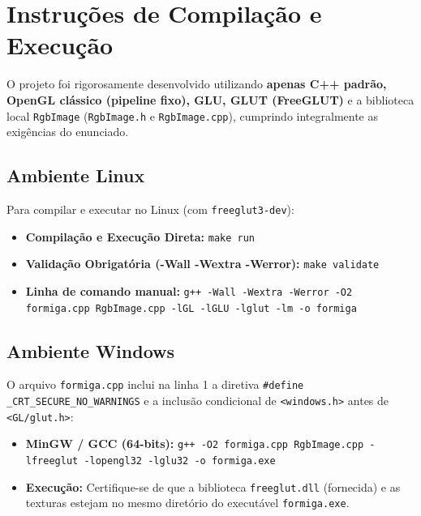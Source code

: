 \documentclass[11pt,a4paper]{article}
\begin{document}
\section{Instruções de Compilação e Execução}

O projeto foi rigorosamente desenvolvido utilizando \textbf{apenas C++ padrão, OpenGL clássico (pipeline fixo), GLU, GLUT (FreeGLUT)} e a biblioteca local \texttt{RgbImage} (\texttt{RgbImage.h} e \texttt{RgbImage.cpp}), cumprindo integralmente as exigências do enunciado.

\subsection{Ambiente Linux}
Para compilar e executar no Linux (com \texttt{freeglut3-dev}):
\begin{itemize}[leftmargin=*,noitemsep]
    \item \textbf{Compilação e Execução Direta:} \texttt{make run}
    \item \textbf{Validação Obrigatória (-Wall -Wextra -Werror):} \texttt{make validate}
    \item \textbf{Linha de comando manual:}
    \texttt{g++ -Wall -Wextra -Werror -O2 formiga.cpp RgbImage.cpp -lGL -lGLU -lglut -lm -o formiga}
\end{itemize}

\subsection{Ambiente Windows}
O arquivo \texttt{formiga.cpp} inclui na linha 1 a diretiva \texttt{\#define \_CRT\_SECURE\_NO\_WARNINGS} e a inclusão condicional de \texttt{<windows.h>} antes de \texttt{<GL/glut.h>}:
\begin{itemize}[leftmargin=*,noitemsep]
    \item \textbf{MinGW / GCC (64-bits):}
    \texttt{g++ -O2 formiga.cpp RgbImage.cpp -lfreeglut -lopengl32 -lglu32 -o formiga.exe}
    \item \textbf{Execução:} Certifique-se de que a biblioteca \texttt{freeglut.dll} (fornecida) e as texturas estejam no mesmo diretório do executável \texttt{formiga.exe}.
\end{itemize}

\newpage

\end{document}
